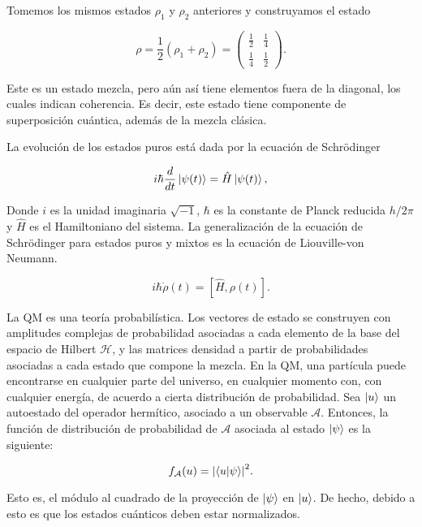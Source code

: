 Tomemos los mismos estados $\rho_1$ y $\rho_2$ anteriores y construyamos el estado

\begin{equation}
    \rho = \frac{1}{2} (\rho_1 + \rho_2) =
    \begin{pmatrix}
        \frac{1}{2} & \frac{1}{4} \\
        \frac{1}{4} & \frac{1}{2}
    \end{pmatrix} .
\end{equation}

Este es un estado mezcla, pero aún así tiene elementos fuera de la diagonal, los cuales indican coherencia. Es decir, este estado tiene componente de superposición cuántica, además de la mezcla clásica.

La evolución de los estados puros está dada por la ecuación de Schrödinger 

\begin{equation}
    i \hbar \frac{d}{dt} \ket{\psi(t)} = \hat{H} \ket{\psi(t)} ,
\end{equation}

Donde $i$ es la unidad imaginaria $\sqrt{-1}$, $\hbar$ es la constante de Planck reducida $h/2\pi$ y $\hat{H}$ es el Hamiltoniano del sistema. La generalización de la ecuación de Schrödinger para estados puros y mixtos es la ecuación de Liouville-von Neumann.

\begin{equation}
    i \hbar \dot{\rho}(t) = [\hat{H}, \rho(t)] .
\end{equation}

La QM es una teoría probabilística. Los vectores de estado se construyen con amplitudes complejas de probabilidad asociadas a cada elemento de la base del espacio de Hilbert $\mathcal{H}$, y las matrices densidad a partir de probabilidades asociadas a cada estado que compone la mezcla. En la QM, una partícula puede encontrarse en cualquier parte del universo, en cualquier momento con, con cualquier energía, de acuerdo a cierta distribución de probabilidad. Sea $\ket{u}$ un autoestado del operador hermítico, asociado a un observable $\mathcal{A}$. Entonces, la función de distribución de probabilidad de $\mathcal{A}$ asociada al estado $\ket{\psi}$ es la siguiente:

\begin{equation}
    f_\mathcal{A}(u) = \abs{\braket{u}{\psi}}^2 .
\end{equation}

Esto es, el módulo al cuadrado de la proyección de $\ket{\psi}$ en $\ket{u}$. De hecho, debido a esto es que los estados cuánticos deben estar normalizados.

